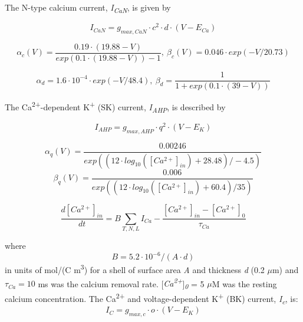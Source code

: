 \documentclass[a4paper,12pt]{article}
\begin{document}
The N-type calcium current, \textit{I}\textit{\textsubscript{CaN}}, is given by

\begin{equation}
I_{CaN}=g_{max, CaN} \cdot c^2 \cdot d \cdot (V-E_{Ca})
\end{equation}

\begin{equation}
\alpha_c(V)=\frac{0.19\cdot(19.88-V)}{ exp(0.1 \cdot(19.88-V))-1}, \  \beta_c(V)=0.046 \cdot exp(-V/20.73)
\end{equation}

\begin{equation}
\alpha_d=1.6\cdot10^{-4}\cdot exp(-V/48.4) , \  \beta_d=\frac 1{1+exp(0.1 \cdot (39-V))}
\end{equation}

The Ca\textsuperscript{2+}-dependent K\textsuperscript{+} (SK) current, \textit{I\textsubscript{AHP}}, is described by

\begin{equation}
I_{AHP} = g_{max, AHP} \cdot q^2 \cdot (V-E_K)
\end{equation}

\begin{equation}
\alpha_q(V)=\frac{0.00246}{exp((12\cdot log_{10}([Ca^{2+}]_{in})+28.48)/-4.5)}
\end{equation} 
\begin{equation}
\beta_q(V)=\frac{0.006}{exp((12\cdot log_{10}([Ca^{2+}]_{in})+60.4)/35)}
\end{equation}

\begin{equation}
\label{eq:CaDynamics}
\frac{d[Ca^{2+}]_{in}}{dt}=B\sum_{T, N, L}
I_{Ca}-\frac{[Ca^{2+}]_{in}-[Ca^{2+}]_0}{\tau_{Ca}}
\end{equation}

where
\begin{equation}
B = 5.2\cdot 10^{-6}/(A \cdot d)
\end{equation}
in units of mol/(C m\textsuperscript{3}) for a shell of
surface area \textit{A} and thickness \textit{d} (0.2 $\mu $m) and  $\tau_{Ca}=10$ ms was the calcium removal rate. [\textit{Ca\textsuperscript{2+}}]\textit{\textsubscript{0}} = 5 $\mu$M was the resting calcium concentration. 
The Ca\textsuperscript{2+} and voltage-dependent K\textsuperscript{+} (BK) current, \textit{I\textsubscript{c}}, is:
\begin{equation}
I_C=g_{max, c} \cdot o \cdot (V-E_K)
\end{equation}
\end{document}
